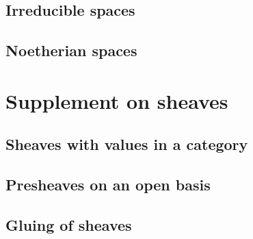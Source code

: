 \documentclass{book}
\begin{document}
    \label{0-prelim-2}



        \subsection{Irreducible spaces}

        \label{0-prelim-2.1}

        



        \subsection{Noetherian spaces}

        \label{0-prelim-2.2}

        



    \section{Supplement on sheaves}

    \label{0-prelim-3}



        \subsection{Sheaves with values in a category}

        \label{0-prelim-3.1}

        



        \subsection{Presheaves on an open basis}

        \label{0-prelim-3.2}

        



        \subsection{Gluing of sheaves}

        \label{0-prelim-3.3}

        
\end{document}
